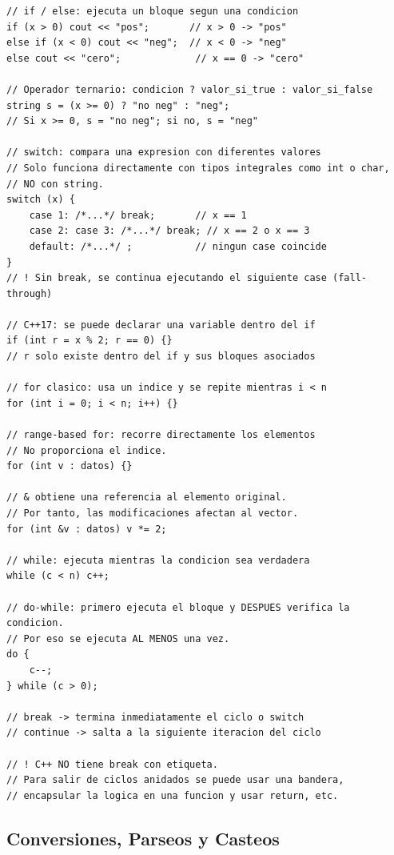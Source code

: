 \documentclass[10pt,a4paper,twocolumn]{article}
\begin{document}
\begin{lstlisting}[style=cpp]
// if / else: ejecuta un bloque segun una condicion
if (x > 0) cout << "pos";       // x > 0 -> "pos"
else if (x < 0) cout << "neg";  // x < 0 -> "neg"
else cout << "cero";             // x == 0 -> "cero"

// Operador ternario: condicion ? valor_si_true : valor_si_false
string s = (x >= 0) ? "no neg" : "neg";
// Si x >= 0, s = "no neg"; si no, s = "neg"

// switch: compara una expresion con diferentes valores
// Solo funciona directamente con tipos integrales como int o char,
// NO con string.
switch (x) {
    case 1: /*...*/ break;       // x == 1
    case 2: case 3: /*...*/ break; // x == 2 o x == 3
    default: /*...*/ ;           // ningun case coincide
}
// ! Sin break, se continua ejecutando el siguiente case (fall-through)

// C++17: se puede declarar una variable dentro del if
if (int r = x % 2; r == 0) {}
// r solo existe dentro del if y sus bloques asociados

// for clasico: usa un indice y se repite mientras i < n
for (int i = 0; i < n; i++) {}

// range-based for: recorre directamente los elementos
// No proporciona el indice.
for (int v : datos) {}

// & obtiene una referencia al elemento original.
// Por tanto, las modificaciones afectan al vector.
for (int &v : datos) v *= 2;

// while: ejecuta mientras la condicion sea verdadera
while (c < n) c++;

// do-while: primero ejecuta el bloque y DESPUES verifica la condicion.
// Por eso se ejecuta AL MENOS una vez.
do {
    c--;
} while (c > 0);

// break -> termina inmediatamente el ciclo o switch
// continue -> salta a la siguiente iteracion del ciclo

// ! C++ NO tiene break con etiqueta.
// Para salir de ciclos anidados se puede usar una bandera,
// encapsular la logica en una funcion y usar return, etc.
\end{lstlisting}




\subsection{Conversiones, Parseos y Casteos}
\end{document}
